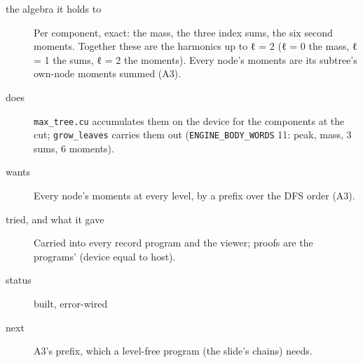 \begin{description}
\item[{the algebra it holds to}] Per component, exact: the mass, the three index sums, the six second moments. Together these are the harmonics up to ℓ = 2 (ℓ = 0 the mass, ℓ = 1 the sums, ℓ = 2 the moments). Every node's moments are its subtree's own-node moments summed (A3).
\item[{does}] \texttt{max\_\allowbreak{}tree.\allowbreak{}cu} accumulates them on the device for the components at the cut; \texttt{grow\_\allowbreak{}leaves} carries them out (\texttt{ENGINE\_\allowbreak{}BODY\_\allowbreak{}WORDS} 11: peak, mass, 3 sums, 6 moments).
\item[{wants}] Every node's moments at every level, by a prefix over the DFS order (A3).
\item[{tried, and what it gave}] Carried into every record program and the viewer; proofs are the programs' (device equal to host).
\item[{status}] built, error-wired
\item[{next}] A3's prefix, which a level-free program (the slide's chains) needs.
\end{description}

